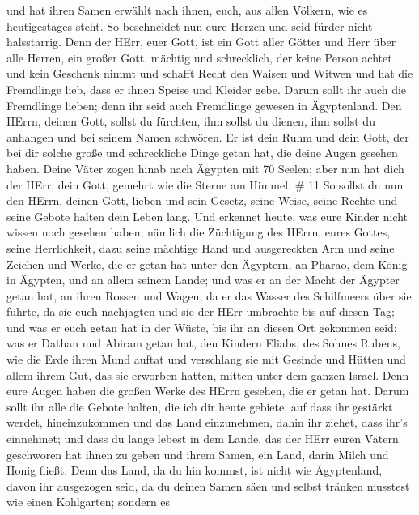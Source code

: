 und hat ihren Samen erwählt nach ihnen, euch, aus allen Völkern, wie es
heutigestages steht.  So beschneidet nun eure Herzen und
seid fürder nicht halsstarrig.  Denn der HErr, euer Gott,
ist ein Gott aller Götter und Herr über alle Herren, ein großer Gott,
mächtig und schrecklich, der keine Person achtet und kein Geschenk nimmt
 und schafft Recht den Waisen und Witwen und hat die
Fremdlinge lieb, dass er ihnen Speise und Kleider gebe. 
Darum sollt ihr auch die Fremdlinge lieben; denn ihr seid auch
Fremdlinge gewesen in Ägyptenland.  Den HErrn, deinen Gott,
sollst du fürchten, ihm sollst du dienen, ihm sollst du anhangen und bei
seinem Namen schwören.  Er ist dein Ruhm und dein Gott, der
bei dir solche große und schreckliche Dinge getan hat, die deine Augen
gesehen haben.  Deine Väter zogen hinab nach Ägypten mit 70
Seelen; aber nun hat dich der HErr, dein Gott, gemehrt wie die Sterne am
Himmel. \# 11  So sollst du nun den HErrn, deinen Gott,
lieben und sein Gesetz, seine Weise, seine Rechte und seine Gebote
halten dein Leben lang.  Und erkennet heute, was eure Kinder
nicht wissen noch gesehen haben, nämlich die Züchtigung des HErrn, eures
Gottes, seine Herrlichkeit, dazu seine mächtige Hand und ausgereckten
Arm  und seine Zeichen und Werke, die er getan hat unter den
Ägyptern, an Pharao, dem König in Ägypten, und an allem seinem Lande;
 und was er an der Macht der Ägypter getan hat, an ihren
Rossen und Wagen, da er das Wasser des Schilfmeers über sie führte, da
sie euch nachjagten und sie der HErr umbrachte bis auf diesen Tag;
 und was er euch getan hat in der Wüste, bis ihr an diesen
Ort gekommen seid;  was er Dathan und Abiram getan hat, den
Kindern Eliabs, des Sohnes Rubens, wie die Erde ihren Mund auftat und
verschlang sie mit Gesinde und Hütten und allem ihrem Gut, das sie
erworben hatten, mitten unter dem ganzen Israel.  Denn eure
Augen haben die großen Werke des HErrn gesehen, die er getan hat.
 Darum sollt ihr alle die Gebote halten, die ich dir heute
gebiete, auf dass ihr gestärkt werdet, hineinzukommen und das Land
einzunehmen, dahin ihr ziehet, dass ihr's einnehmet;  und
dass du lange lebest in dem Lande, das der HErr euren Vätern geschworen
hat ihnen zu geben und ihrem Samen, ein Land, darin Milch und Honig
fließt.  Denn das Land, da du hin kommst, ist nicht wie
Ägyptenland, davon ihr ausgezogen seid, da du deinen Samen säen und
selbst tränken musstest wie einen Kohlgarten;  sondern es

